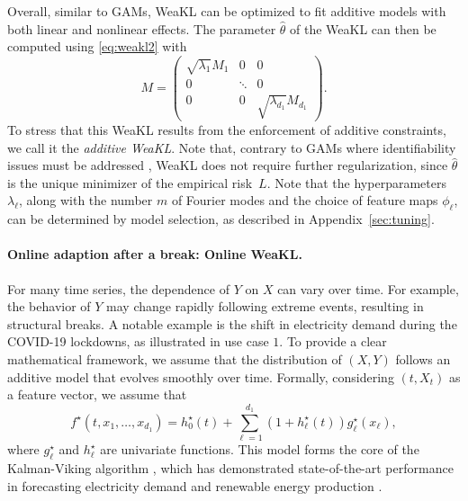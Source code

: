 Overall, similar to GAMs, WeaKL can be optimized to fit additive models with both linear and nonlinear effects. The parameter $\hat \theta$ of the WeaKL can then be computed using \eqref{eq:weakl2}
with 
\[M = \begin{pmatrix}
        \sqrt{\lambda_1} M_1& 0  & 0\\
        0 & \ddots&  0\\
        0 & 0& \sqrt{\lambda_{d_1}} M_{d_1}
    \end{pmatrix}.\]
To stress that this WeaKL results from the enforcement of additive constraints, we call it the \textit{additive WeaKL}.
Note that, contrary to GAMs where identifiability issues must be addressed \citep{wood2017generalizedbook}, WeaKL does not require further regularization, since $\hat \theta$ is the unique minimizer of the empirical risk~$L$. 
Note that the hyperparameters $\lambda_\ell$, along with the number $m$ of Fourier modes and the choice of feature maps  $\phi_\ell$, can be determined by model selection, as described in Appendix~\ref{sec:tuning}.

\paragraph{Online adaption after a break: Online WeaKL.}
For many time series, the dependence of $Y$ on $X$ can vary over time. For example, the behavior of $Y$ may change rapidly following extreme events, resulting in structural breaks. A notable example is the shift in electricity demand during the COVID-19 lockdowns, as illustrated in use case $1$. To provide a clear mathematical framework, we assume that the distribution of $(X, Y)$ follows an additive model that evolves smoothly over time. Formally, considering $(t, X_t)$ as a feature vector, we assume that
\begin{equation}
    f^\star(t, x_1, \hdots, x_{d_1}) = h_0^\star(t)+ \sum_{\ell=1}^{d_1} (1+ h_\ell^\star(t))  g_\ell^\star(x_\ell),
    \label{eq:model}
\end{equation}
where $g_\ell^\star$ and $h_\ell^\star$ are univariate functions. This model forms the core of the Kalman-Viking algorithm \citep{vilmarest2024viking}, which has demonstrated state-of-the-art performance in forecasting electricity demand and renewable energy production \citep{obst2021adaptive, vilmarest2022state, Vilamarest2024adaptive}. 

